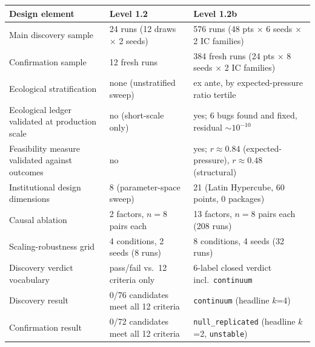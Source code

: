 \begin{tabular}{@{}lll@{}}
\toprule
\textbf{Design element} & \textbf{Level 1.2} & \textbf{Level 1.2b} \\
\midrule
Main discovery sample & 24 runs (12 draws $\times$ 2 seeds) & 576 runs (48 pts $\times$ 6 seeds $\times$ 2 IC families) \\
Confirmation sample & 12 fresh runs & 384 fresh runs (24 pts $\times$ 8 seeds $\times$ 2 IC families) \\
Ecological stratification & none (unstratified sweep) & ex ante, by expected-pressure ratio tertile \\
Ecological ledger validated at production scale & no (short-scale only) & yes; 6 bugs found and fixed, residual $\sim10^{-10}$ \\
Feasibility measure validated against outcomes & no & yes; $r\approx0.84$ (expected-pressure), $r\approx0.48$ (structural) \\
Institutional design dimensions & 8 (parameter-space sweep) & 21 (Latin Hypercube, 60 points, 0 packages) \\
Causal ablation & 2 factors, $n=8$ pairs each & 13 factors, $n=8$ pairs each (208 runs) \\
Scaling-robustness grid & 4 conditions, 2 seeds (8 runs) & 8 conditions, 4 seeds (32 runs) \\
Discovery verdict vocabulary & pass/fail vs.\ 12 criteria only & 6-label closed verdict incl.\ \texttt{continuum} \\
Discovery result & 0/76 candidates meet all 12 criteria & \texttt{continuum} (headline $k$=4) \\
Confirmation result & 0/72 candidates meet all 12 criteria & \texttt{null\_replicated} (headline $k$=2, \texttt{unstable}) \\
\bottomrule
\end{tabular}
